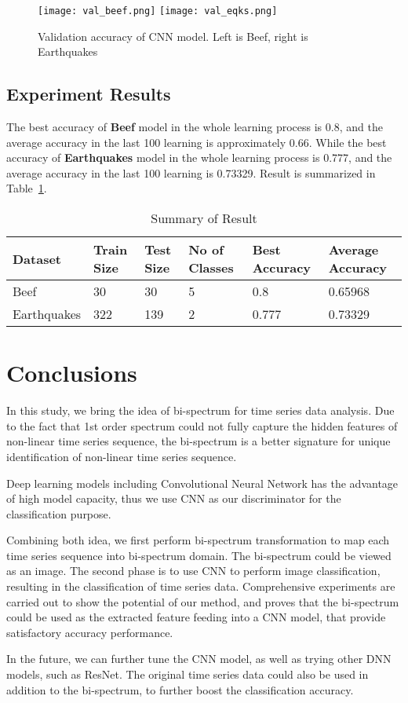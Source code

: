\documentclass[letterpaper,12pt]{article}
\begin{document}
\begin{figure}[]
\centering
\texttt{[image: val\_beef.png]}
\texttt{[image: val\_eqks.png]}
\caption{Validation accuracy of CNN model. Left is Beef, right is Earthquakes}
\label{val_acc}
\end{figure}



\subsection{Experiment Results}

The best accuracy of \textbf{Beef} model in the whole learning process is 0.8, and the average accuracy in the last 100 learning is approximately 0.66. While the best accuracy of \textbf{Earthquakes} model in the whole learning process is 0.777, and the average accuracy in the last 100 learning is 0.73329. Result is summarized in Table~\ref{description_of_data}.

\begin{table}[ht]
\centering
\caption{Summary of Result}
\label{description_of_data}
\begin{tabular}{l|l|l|l|l|l}
\toprule 
Dataset & Train Size & Test Size & No of Classes & Best Accuracy & Average Accuracy\\ \midrule
Beef & 30 & 30 & 5 & 0.8 & 0.65968\\
Earthquakes & 322 & 139 & 2 & 0.777 & 0.73329\\
\bottomrule
\end{tabular}
\end{table}


\section{Conclusions}
\label{sec-conclusion}
In this study, we bring the idea of bi-spectrum for time series data analysis. Due to the fact that 1st order spectrum could not fully capture the hidden features of non-linear time series sequence, the bi-spectrum is a better signature for unique identification of non-linear time series sequence.

Deep learning models including Convolutional Neural Network has the advantage of high model capacity, thus we use CNN as our discriminator for the classification purpose.

Combining both idea, we first perform bi-spectrum transformation to map each time series sequence into bi-spectrum domain. The bi-spectrum could be viewed as an image. The second phase is to use CNN to perform image classification, resulting in the classification of time series data.
Comprehensive experiments are carried out to show the potential of our method, and proves that the bi-spectrum could be used as the extracted feature feeding into a CNN model, that provide satisfactory accuracy performance.

In the future, we can further tune the CNN model, as well as trying other DNN models, such as ResNet. The original time series data could also be used in addition to the bi-spectrum, to further boost the classification accuracy.



\end{document}
